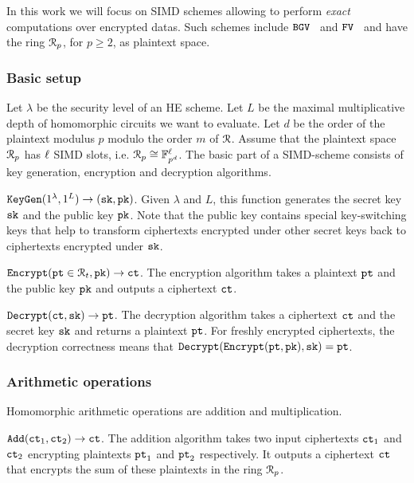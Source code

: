 In this work we will focus on SIMD schemes allowing to perform \emph{exact} computations over encrypted datas. Such schemes include $\mathtt{BGV}$~\cite{BGV12} and $\mathtt{FV}$~\cite{FV12} and have the ring $\mathcal{R}_p$, for $p\geq 2$, as plaintext space.

\subsubsection{Basic setup}

Let $\lambda$ be the security level of an HE scheme.
Let $L$ be the maximal multiplicative depth of homomorphic circuits we want to evaluate.
Let $d$ be the order of the plaintext modulus $p$ modulo the order $m$ of $\mathcal{R}$.
Assume that the plaintext space $\mathcal{R}_p$ has $\ell$ SIMD slots, i.e. $\mathcal{R}_p \cong \mathbb{F}^\ell_{p^d}$.
The basic part of a SIMD-scheme consists of key generation, encryption and decryption algorithms.

${\mathtt{KeyGen}}(1^\lambda, 1^L) \rightarrow ({\mathtt{sk}}, {\mathtt{pk}})$. Given $\lambda$ and $L$, this function generates the secret key ${\mathtt{sk}}$ and the public key ${\mathtt{pk}}$.
Note that the public key contains special key-switching keys that help to transform ciphertexts encrypted under other secret keys back to ciphertexts encrypted under ${\mathtt{sk}}$. 

${\mathtt{Encrypt}}({\mathtt{pt}} \in \mathcal{R}_t, {\mathtt{pk}}) \rightarrow {\mathtt{ct}}$. The encryption algorithm takes a plaintext ${\mathtt{pt}}$ and the public key ${\mathtt{pk}}$ and outputs a ciphertext ${\mathtt{ct}}$.

${\mathtt{Decrypt}}({\mathtt{ct}}, {\mathtt{sk}}) \rightarrow {\mathtt{pt}}$. The decryption algorithm takes a ciphertext ${\mathtt{ct}}$ and the secret key ${\mathtt{sk}}$ and returns a plaintext ${\mathtt{pt}}$.
For freshly encrypted ciphertexts, the decryption correctness means that ${\mathtt{Decrypt}}({\mathtt{Encrypt}}({\mathtt{pt}}, {\mathtt{pk}}), {\mathtt{sk}}) = {\mathtt{pt}}$. 


\subsubsection{Arithmetic operations}

Homomorphic arithmetic operations are addition and multiplication.

${\mathtt{Add}}({\mathtt{ct}}_1, {\mathtt{ct}}_2) \rightarrow {\mathtt{ct}}$. The addition algorithm takes two input ciphertexts ${\mathtt{ct}}_1$ and ${\mathtt{ct}}_2$ encrypting plaintexts ${\mathtt{pt}}_1$ and ${\mathtt{pt}}_2$ respectively.
It outputs a ciphertext ${\mathtt{ct}}$ that encrypts the sum of these plaintexts in the ring $\mathcal{R}_p$.

